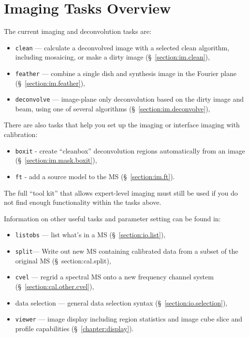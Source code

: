 \section{Imaging Tasks Overview}
\label{section:im.tasks}

The current imaging and deconvolution tasks are:
\begin{itemize}
   \item {\tt clean} --- calculate a deconvolved image with a selected clean
         algorithm, including mosaicing, or make a dirty image
         (\S~\ref{section:im.clean}),
   \item {\tt feather} --- combine a single dish and synthesis image in the
         Fourier plane (\S~\ref{section:im.feather}),
   \item {\tt deconvolve} --- image-plane only deconvolution based on
         the dirty image and beam, using one of several algorithms
         (\S~\ref{section:im.deconvolve}),
\end{itemize}

There are also tasks that help you set up the imaging or interface
imaging with calibration:

\begin{itemize}
   \item {\tt boxit} - create ``cleanbox'' deconvolution regions automatically
         from an image
	 (\S~\ref{section:im.mask.boxit}),
   \item {\tt ft} - add a source model to the MS (\S~\ref{section:im.ft}).
\end{itemize}

The full ``tool kit'' that allows expert-level imaging must still be
used if you do not find enough functionality within the tasks above. 

Information on other useful tasks and parameter setting can be found in:
\begin{itemize}
   \item {\tt listobs} --- list what's in a MS (\S~\ref{section:io.list}),
   \item {\tt split}--- Write out new MS containing calibrated data
      from a subset of the original MS (\S~{section:cal.split}),
   \item {\tt cvel} --- regrid a spectral MS onto a new frequency
      channel system
      (\S~\ref{section:cal.other.cvel}),
   \item data selection --- general data selection syntax
      (\S~\ref{section:io.selection}),
   \item {\tt viewer} --- image display including region statistics and
         image cube slice and profile capabilities
         (\S~\ref{chapter:display}).
\end{itemize}

